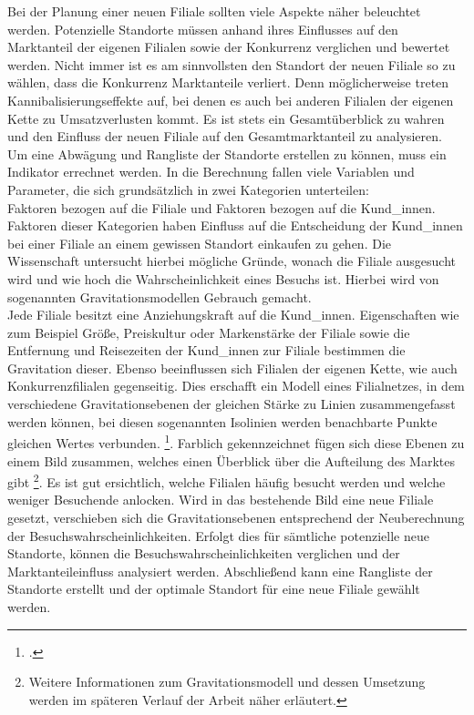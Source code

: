 Bei der Planung einer neuen Filiale sollten viele Aspekte näher beleuchtet werden.
Potenzielle Standorte müssen anhand ihres Einflusses auf den Marktanteil der eigenen Filialen sowie der Konkurrenz verglichen und bewertet werden.
Nicht immer ist es am sinnvollsten den Standort der neuen Filiale so zu wählen, dass die Konkurrenz Marktanteile verliert.
Denn möglicherweise treten Kannibalisierungseffekte auf, bei denen es auch bei anderen Filialen der eigenen Kette zu Umsatzverlusten kommt.
Es ist stets ein Gesamtüberblick zu wahren und den Einfluss der neuen Filiale auf den Gesamtmarktanteil zu analysieren.\\
Um eine Abwägung und Rangliste der Standorte erstellen zu können, muss ein Indikator errechnet werden.
In die Berechnung fallen viele Variablen und Parameter, die sich grundsätzlich in zwei Kategorien unterteilen:\\
Faktoren bezogen auf die Filiale und Faktoren bezogen auf die Kund\_innen.
Faktoren dieser Kategorien haben Einfluss auf die Entscheidung der Kund\_innen bei einer Filiale an einem gewissen Standort einkaufen zu gehen.
Die Wissenschaft untersucht hierbei mögliche Gründe, wonach die Filiale ausgesucht wird und wie hoch die Wahrscheinlichkeit eines Besuchs ist. 
Hierbei wird von sogenannten Gravitationsmodellen Gebrauch gemacht.\\
Jede Filiale besitzt eine Anziehungskraft auf die Kund\_innen.
Eigenschaften wie zum Beispiel Größe, Preiskultur oder Markenstärke der Filiale sowie die Entfernung und Reisezeiten der Kund\_innen zur Filiale bestimmen die Gravitation dieser.
Ebenso beeinflussen sich Filialen der eigenen Kette, wie auch Konkurrenzfilialen gegenseitig.
Dies erschafft ein Modell eines Filialnetzes, in dem verschiedene Gravitationsebenen der gleichen Stärke zu  Linien zusammengefasst werden können, bei diesen sogenannten Isolinien werden benachbarte Punkte gleichen Wertes verbunden.  \footcite{neumair_definition_2018}.
Farblich gekennzeichnet fügen sich diese Ebenen zu einem Bild zusammen, welches einen Überblick über die Aufteilung des Marktes gibt \footnote{Weitere Informationen zum Gravitationsmodell und dessen Umsetzung werden im späteren Verlauf der Arbeit näher erläutert.}.
Es ist gut ersichtlich, welche Filialen häufig besucht werden und welche weniger Besuchende anlocken.
Wird in das bestehende Bild eine neue Filiale gesetzt, verschieben sich die Gravitationsebenen entsprechend der Neuberechnung der Besuchswahrscheinlichkeiten.
Erfolgt dies für sämtliche potenzielle neue Standorte,  können die Besuchswahrscheinlichkeiten verglichen und der Marktanteileinfluss analysiert werden.
Abschließend kann eine Rangliste der Standorte erstellt und der optimale Standort für eine neue Filiale gewählt werden.

